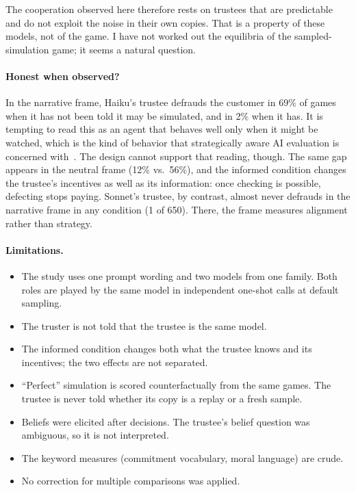\documentclass[11pt]{article}
\begin{document}
The cooperation observed here therefore rests on trustees that are predictable and do not exploit the noise in their own copies. That is a property of these models, not of the game. I have not worked out the equilibria of the sampled-simulation game; it seems a natural question.

\paragraph{Honest when observed?}
In the narrative frame, Haiku's trustee defrauds the customer in 69\% of games when it has not been told it may be simulated, and in 2\% when it has. It is tempting to read this as an agent that behaves well only when it might be watched, which is the kind of behavior that strategically aware AI evaluation is concerned with~\cite{kovarik2025testing}. The design cannot support that reading, though. The same gap appears in the neutral frame (12\% vs.\ 56\%), and the informed condition changes the trustee's incentives as well as its information: once checking is possible, defecting stops paying. Sonnet's trustee, by contrast, almost never defrauds in the narrative frame in any condition (1 of 650). There, the frame measures alignment rather than strategy.

\paragraph{Limitations.}
\begin{itemize}[nosep]
  \item The study uses one prompt wording and two models from one family. Both roles are played by the same model in independent one-shot calls at default sampling.
  \item The truster is not told that the trustee is the same model.
  \item The informed condition changes both what the trustee knows and its incentives; the two effects are not separated.
  \item ``Perfect'' simulation is scored counterfactually from the same games. The trustee is never told whether its copy is a replay or a fresh sample.
  \item Beliefs were elicited after decisions. The trustee's belief question was ambiguous, so it is not interpreted.
  \item The keyword measures (commitment vocabulary, moral language) are crude.
  \item No correction for multiple comparisons was applied.
\end{itemize}
\end{document}
